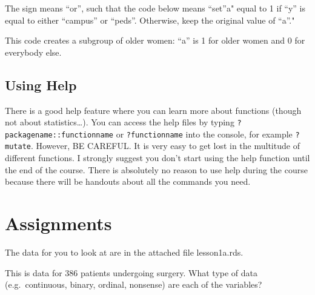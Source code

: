 \documentclass[]{book}
\newenvironment{Shaded}{\begin{snugshade}}{\end{snugshade}}
\newcommand{\DataTypeTok}[1]{\textcolor[rgb]{0.13,0.29,0.53}{#1}}
\newcommand{\DecValTok}[1]{\textcolor[rgb]{0.00,0.00,0.81}{#1}}
\newcommand{\KeywordTok}[1]{\textcolor[rgb]{0.13,0.29,0.53}{\textbf{#1}}}
\newcommand{\NormalTok}[1]{#1}
\newcommand{\OperatorTok}[1]{\textcolor[rgb]{0.81,0.36,0.00}{\textbf{#1}}}
\newcommand{\StringTok}[1]{\textcolor[rgb]{0.31,0.60,0.02}{#1}}
\begin{document}
The \texttt{\textbar{}} sign means ``or'', such that the code below
means ``set''a" equal to 1 if ``y'' is equal to either ``campus'' or
``peds''. Otherwise, keep the original value of ``a''."

\begin{Shaded}
\end{Shaded}

This code creates a subgroup of older women: ``a'' is 1 for older women
and 0 for everybody else.

\begin{Shaded}
\end{Shaded}

\hypertarget{using-help-1}{%
\subsection{Using Help}\label{using-help-1}}

There is a good help feature where you can learn more about functions
(though not about statistics\ldots). You can access the help files by
typing \texttt{?packagename::functionname} or \texttt{?functionname}
into the console, for example \texttt{?mutate}. However, BE CAREFUL. It
is very easy to get lost in the multitude of different functions. I
strongly suggest you don't start using the help function until the end
of the course. There is absolutely no reason to use help during the
course because there will be handouts about all the commands you need.

\hypertarget{assignments-7}{%
\section{Assignments}\label{assignments-7}}

The data for you to look at are in the attached file lesson1a.rds.

This is data for 386 patients undergoing surgery. What type of data
(e.g.~continuous, binary, ordinal, nonsense) are each of the variables?
\end{document}
